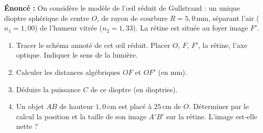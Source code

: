 \documentclass[11pt]{article}
\begin{document}
\begin{exoresolu}
\textbf{Énoncé :} On considère le modèle de l'œil réduit de Gullstrand : un unique dioptre sphérique de centre $O$, de rayon de courbure $R = 5,0\,\text{mm}$, séparant l'air ($n_1 = 1,00$) de l'humeur vitrée ($n_2 = 1,33$). La rétine est située au foyer image $F'$.
\begin{enumerate}
    \item Tracer le schéma annoté de cet œil réduit. Placer $O$, $F$, $F'$, la rétine, l'axe optique. Indiquer le sens de la lumière.
    \item Calculer les distances algébriques $OF$ et $OF'$ (en mm).
    \item Déduire la puissance $C$ de ce dioptre (en dioptries).
    \item Un objet $AB$ de hauteur $1,0\,\text{cm}$ est placé à $25\,\text{cm}$ de $O$. Déterminer par le calcul la position et la taille de son image $A'B'$ sur la rétine. L'image est-elle nette ?
\end{enumerate}


\end{exoresolu}
\end{document}
